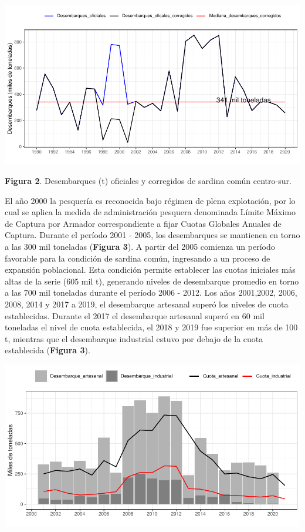\documentclass[
  spanish,
]{article}
\begin{document}
\begin{center}\includegraphics{FigurasInforme_Marzo/F2_ant-1} \end{center}

\vspace{-0.5cm}
\small

\textbf{Figura 2}. Desembarques (t) oficiales y corregidos de sardina
común centro-sur. \vspace{0.5cm} \normalsize

El año 2000 la pesquería es reconocida bajo régimen de plena
explotación, por lo cual se aplica la medida de administración pesquera
denominada Límite Máximo de Captura por Armador correspondiente a fijar
Cuotas Globales Anuales de Captura. Durante el período 2001 - 2005, los
desembarques se mantienen en torno a las 300 mil toneladas
(\textbf{Figura 3}). A partir del 2005 comienza un período favorable
para la condición de sardina común, ingresando a un proceso de expansión
poblacional. Esta condición permite establecer las cuotas iniciales más
altas de la serie (605 mil t), generando niveles de desembarque promedio
en torno a las 700 mil toneladas durante el período 2006 - 2012. Los
años 2001,2002, 2006, 2008, 2014 y 2017 a 2019, el desembarque artesanal
superó los niveles de cuota establecidas. Durante el 2017 el desembarque
artesanal superó en 60 mil toneladas el nivel de cuota establecida, el
2018 y 2019 fue superior en más de 100 t, mientras que el desembarque
industrial estuvo por debajo de la cuota establecida (\textbf{Figura
3}).

\begin{center}\includegraphics{FigurasInforme_Marzo/F3_ant-1} \end{center}
\end{document}
